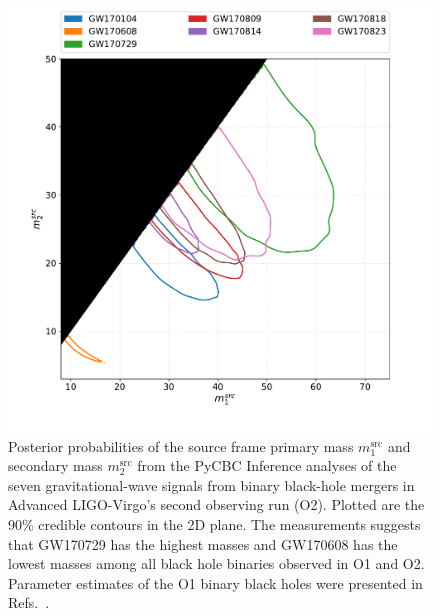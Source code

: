 \begin{figure}[ht]
  \includegraphics[width=\textwidth]{figures/o2_bbh_pe/all_o2_m1m2source.pdf}
  \caption{Posterior probabilities of the source frame primary mass $m_1^{\mathrm{src}}$ and secondary mass $m_2^{\mathrm{src}}$ from the PyCBC Inference analyses of the seven gravitational-wave signals from binary black-hole mergers in Advanced LIGO-Virgo's second observing run (O2). Plotted are the 90\% credible contours in the 2D plane. 
The measurements suggests that GW170729 has the highest masses and GW170608 has the lowest masses among all black hole binaries observed in O1 and O2. Parameter estimates of the O1 binary black holes were presented in Refs.~\cite{Biwer:2018osg,TheLIGOScientific:2016pea}.\label{fig:m1m2_plots}} 
\end{figure}

